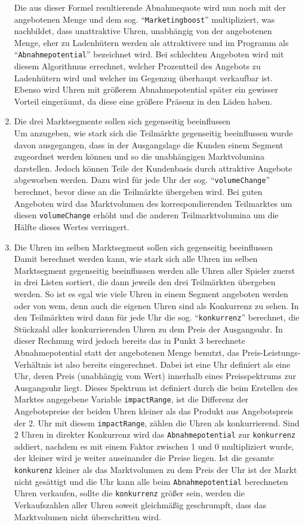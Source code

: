 \begin{enumerate}
	Die aus dieser Formel resultierende Abnahmequote wird nun noch mit der angebotenen Menge und dem sog. \enquote{\texttt{Marketingboost}} multipliziert, was nachbildet, dass unattraktive Uhren, unabhängig von der angebotenen Menge, eher zu Ladenhütern werden als attraktivere und im Programm als \enquote{\texttt{Abnahmepotential}} bezeichnet wird. Bei schlechten Angeboten wird mit diesem Algorithmus errechnet, welcher Prozentteil des Angebots zu Ladenhütern wird und welcher im Gegenzug überhaupt verkaufbar ist. Ebenso wird Uhren mit größerem Abnahmepotential später ein gewisser Vorteil eingeräumt, da diese eine größere Präsenz in den Läden haben.
	\item Die drei Marktsegmente sollen sich gegenseitig beeinflussen
	\\ Um anzugeben, wie stark sich die Teilmärkte gegenseitig beeinflussen wurde davon ausgegangen, dass in der Ausgangslage die Kunden einem Segment zugeordnet werden können und so die unabhängigen Marktvolumina darstellen. Jedoch können Teile der Kundenbasis durch attraktive Angebote abgeworben werden. Dazu wird für jede Uhr der sog. \enquote{\texttt{volumeChange}} berechnet, bevor diese an die Teilmärkte übergeben wird. Bei guten Angeboten wird das Marktvolumen des korrespondierenden Teilmarktes um diesen \texttt{volumeChange} erhöht und die anderen Teilmarktvolumina um die Hälfte dieses Wertes verringert.
	\item Die Uhren im selben Marktsegment sollen sich gegenseitig beeinflussen
	\\ Damit berechnet werden kann, wie stark sich alle Uhren im selben Marktsegment gegenseitig beeinflussen werden alle Uhren aller Spieler zuerst in drei Listen sortiert, die dann jeweils den drei Teilmärkten übergeben werden. So ist es egal wie viele Uhren in einem Segment angeboten werden oder von wem, denn auch die eigenen Uhren sind als Konkurrenz zu sehen. In den Teilmärkten wird dann für jede Uhr die sog. \enquote{\texttt{konkurrenz}} berechnet, die Stückzahl aller konkurrierenden Uhren zu dem Preis der Ausgangsuhr. In dieser Rechnung wird jedoch bereits das in Punkt 3 berechnete Abnahmepotential statt der angebotenen Menge benutzt, das Preis-Leistungs-Verhältnis ist also bereits eingerechnet. Dabei ist eine Uhr definiert als eine Uhr, deren Preis (unabhängig vom Wert) innerhalb eines Preisspektrums zur Ausgangsuhr liegt. Dieses Spektrum ist definiert durch die beim Erstellen des Marktes angegebene Variable \texttt{impactRange}, ist die Differenz der Angebotspreise der beiden Uhren kleiner als das Produkt aus Angebotspreis der 2. Uhr mit diesem \texttt{impactRange}, zählen die Uhren als konkurrierend. Sind 2 Uhren in direkter Konkurrenz wird das \texttt{Abnahmepotential} zur \texttt{konkurrenz} addiert, nachdem es mit einem Faktor zwischen 1 und 0 multipliziert wurde, der kleiner wird je weiter auseinander die Preise liegen. Ist die gesamte \texttt{konkurenz} kleiner als das Marktvolumen zu dem Preis der Uhr ist der Markt nicht gesättigt und die Uhr kann alle beim \texttt{Abnahmepotential} berechneten Uhren verkaufen, sollte die \texttt{konkurrenz} größer sein, werden die Verkaufszahlen aller Uhren soweit gleichmäßig geschrumpft, dass das Marktvolumen nicht überschritten wird.
\end{enumerate}
